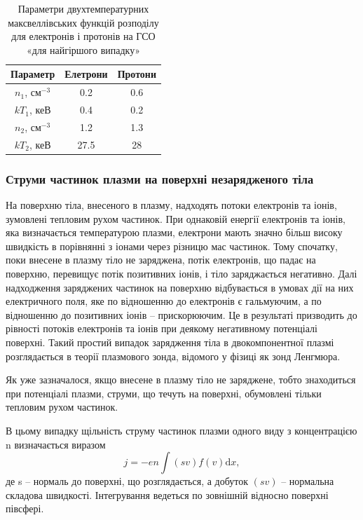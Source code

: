 \documentclass[a4paper,12pt]{article}
\begin{document}
\begin{table}[!ht]
	\caption{Параметри двухтемпературних максвеллівських функцій розподілу
для електронів і протонів на ГСО «для найгіршого випадку»}
    \begin{tabular}{|c|c|c|}
        \hline
        Параметр     & Елетрони & Протони \\ \hline
        $n_1$, см$^{-3}$ & 0.2      & 0.6     \\ \hline
        $kT_1$, кеВ    & 0.4      & 0.2     \\ \hline
        $n_2$, см$^{-3}$ & 1.2      & 1.3     \\ \hline
        $kT_2$, кеВ    & 27.5     & 28      \\
        \hline
    \end{tabular}
    \label{tab:density_table}
\end{table}

\subsubsection{Струми частинок плазми на поверхні незарядженого тіла}
На поверхню тіла, внесеного в плазму, надходять потоки електронів та іонів, зумовлені тепловим рухом частинок. При однаковій енергії електронів та іонів, яка визначається  температурою плазми, електрони мають значно більш високу швидкість в порівнянні з іонами через різницю мас частинок. Тому спочатку, поки внесене в плазму тіло не заряджена, потік електронів, що падає на поверхню, перевищує потік позитивних іонів, і тіло заряджається негативно. Далі надходження заряджених частинок на поверхню відбувається в умовах дії на них електричного поля, яке по відношенню до електронів є гальмуючим, а по відношенню до позитивних іонів -- прискорюючим. Це в результаті призводить до рівності потоків електронів та іонів при деякому негативному потенціалі поверхні. Такий простий випадок зарядження тіла в двокомпонентної плазмі розглядається в теорії плазмового зонда, відомого у фізиці як зонд Ленгмюра.


Як уже зазначалося, якщо внесене в плазму тіло не заряджене, тобто знаходиться при потенціалі плазми, струми, що течуть на поверхні, обумовлені тільки тепловим рухом частинок.


В цьому випадку щільність струму частинок плазми одного виду з концентрацією n визначається виразом
\[
j = -en \int (sv) f(v) \mathrm{d}x,
\]
де s -- нормаль до поверхні, що розглядається, а добуток $(sv)$ -- нормальна складова швидкості. Інтегрування ведеться по зовнішній відносно поверхні півсфері.
\end{document}

